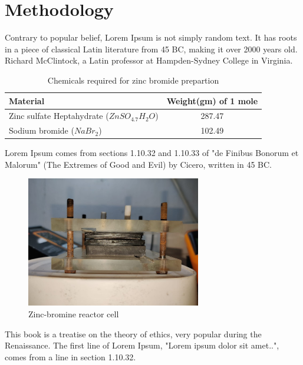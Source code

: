 \documentclass[../main.tex]{subfiles}
\begin{document}
 
\chapter{Methodology}

Contrary to popular belief, Lorem Ipsum is not simply random text. It has roots in a piece of classical Latin literature from 45 BC, making it over 2000 years old. Richard McClintock, a Latin professor at Hampden-Sydney College in Virginia.

\bgroup
\def\arraystretch{1.5}
\begin{table}[H]
    \caption{Chemicals required for zinc bromide prepartion}
    \begin{center}
            \begin{tabular}{|l|c|}\hline
                \textbf{Material}                           & \textbf{Weight(gm) of 1 mole} \\ \hline
                Zinc sulfate Heptahydrate ($ZnSO_4.7H_2O$)  & 287.47 \\
                Sodium bromide ($NaBr_2$)                   & 102.49 \\ \hline 
            \end{tabular}
    \end{center}
        \label{tab:chemical}
\end{table}
\egroup

Lorem Ipsum comes from sections 1.10.32 and 1.10.33 of "de Finibus Bonorum et Malorum" (The Extremes of Good and Evil) by Cicero, written in 45 BC. 

\begin{figure}[H]
        \centering
        \includegraphics[width=3in]{figures/reactor-front.jpg}
        \caption[Zinc-bromine reactor cell]
        {Zinc-bromine reactor cell}
\end{figure}
 This book is a treatise on the theory of ethics, very popular during the Renaissance. The first line of Lorem Ipsum, "Lorem ipsum dolor sit amet..", comes from a line in section 1.10.32.
\end{document}
